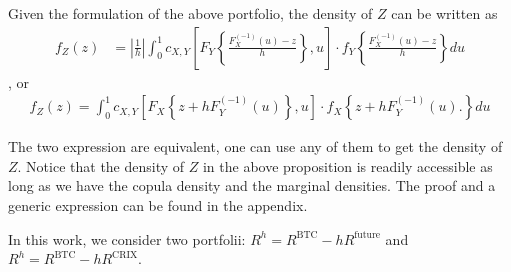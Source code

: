 \begin{prop} Given the formulation of the above portfolio, the density of $Z$ can be written as
  \begin{align}
  f_{Z}(z) &= \left|\frac{1}{h}\right|\int_0^1 c_{X, Y} \left[
  F_{Y}\left\{\frac{F^{(-1)}_{X}(u)-z}{h}\right\}, u
  \right]
   \cdot
  f_{Y}
  \left\{\frac{F^{(-1)}_{X}(u)-z}{h}\right\} du \label{eq:density1}
  \end{align}, or
    \begin{align}
      f_{Z}(z)
      = \int_0^1 c_{X, Y} \left[
      F_{X}\left\{z + h F^{(-1)}_{Y}(u)\right\}, u
      \right]
       \cdot
      f_{X}
      \left\{
      z+ hF^{(-1)}_{Y}(u).
      \right\} du\label{eq:density2}
  \end{align}
  \end{prop}
The two expression are equivalent, one can use any of them to get the
density of $Z$. 
Notice that the density of $Z$ in the above proposition is readily accessible as long as we have
the copula density and the marginal densities.
The proof and a generic expression can be found in the
appendix. \medskip


In this work, we consider two portfolii: $R^h = R^{\text{BTC}} - h R^{\text{future}}$ and $R^h = R^{\text{BTC}} - h R^{\text{CRIX}}$.


